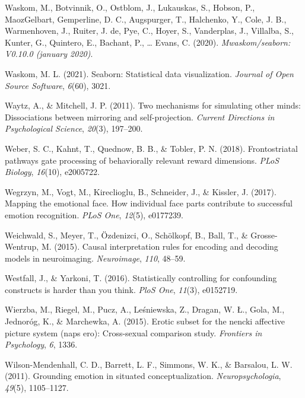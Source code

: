 \documentclass[11pt,american,]{memoir} %
\begin{document}
\leavevmode\hypertarget{ref-Waskom2020-qq}{}%
Waskom, M., Botvinnik, O., Ostblom, J., Lukauskas, S., Hobson, P., MaozGelbart, Gemperline, D. C., Augspurger, T., Halchenko, Y., Cole, J. B., Warmenhoven, J., Ruiter, J. de, Pye, C., Hoyer, S., Vanderplas, J., Villalba, S., Kunter, G., Quintero, E., Bachant, P., \ldots{} Evans, C. (2020). \emph{Mwaskom/seaborn: V0.10.0 (january 2020)}.

\leavevmode\hypertarget{ref-waskom2021seaborn}{}%
Waskom, M. L. (2021). Seaborn: Statistical data visualization. \emph{Journal of Open Source Software}, \emph{6}(60), 3021.

\leavevmode\hypertarget{ref-waytz2011two}{}%
Waytz, A., \& Mitchell, J. P. (2011). Two mechanisms for simulating other minds: Dissociations between mirroring and self-projection. \emph{Current Directions in Psychological Science}, \emph{20}(3), 197--200.

\leavevmode\hypertarget{ref-weber2018frontostriatal}{}%
Weber, S. C., Kahnt, T., Quednow, B. B., \& Tobler, P. N. (2018). Frontostriatal pathways gate processing of behaviorally relevant reward dimensions. \emph{PLoS Biology}, \emph{16}(10), e2005722.

\leavevmode\hypertarget{ref-Wegrzyn2017-ke}{}%
Wegrzyn, M., Vogt, M., Kireclioglu, B., Schneider, J., \& Kissler, J. (2017). Mapping the emotional face. How individual face parts contribute to successful emotion recognition. \emph{PLoS One}, \emph{12}(5), e0177239.

\leavevmode\hypertarget{ref-Weichwald2015-aj}{}%
Weichwald, S., Meyer, T., Özdenizci, O., Schölkopf, B., Ball, T., \& Grosse-Wentrup, M. (2015). Causal interpretation rules for encoding and decoding models in neuroimaging. \emph{Neuroimage}, \emph{110}, 48--59.

\leavevmode\hypertarget{ref-westfall2016statistically}{}%
Westfall, J., \& Yarkoni, T. (2016). Statistically controlling for confounding constructs is harder than you think. \emph{PloS One}, \emph{11}(3), e0152719.

\leavevmode\hypertarget{ref-wierzba2015erotic}{}%
Wierzba, M., Riegel, M., Pucz, A., Leśniewska, Z., Dragan, W. Ł., Gola, M., Jednoróg, K., \& Marchewka, A. (2015). Erotic subset for the nencki affective picture system (naps ero): Cross-sexual comparison study. \emph{Frontiers in Psychology}, \emph{6}, 1336.

\leavevmode\hypertarget{ref-wilson2011grounding}{}%
Wilson-Mendenhall, C. D., Barrett, L. F., Simmons, W. K., \& Barsalou, L. W. (2011). Grounding emotion in situated conceptualization. \emph{Neuropsychologia}, \emph{49}(5), 1105--1127.
\end{document}
